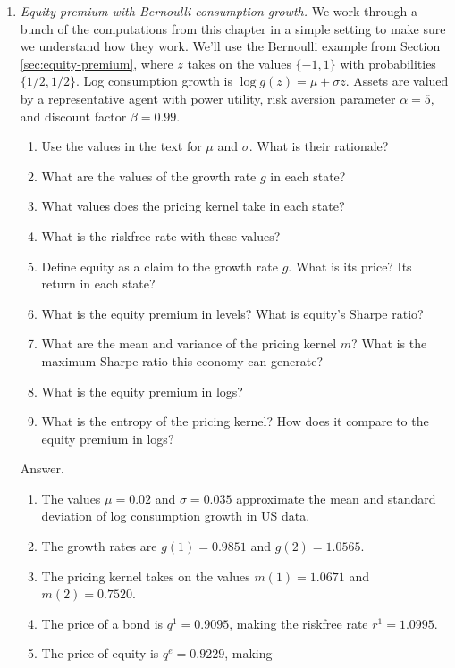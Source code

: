 \documentclass[11pt]{article}
\begin{document}
\begin{enumerate}

\item {\it Equity premium with Bernoulli consumption growth.\/}
We work through a bunch of the computations from this chapter
in a simple setting to make sure we understand how they work.
We'll use the Bernoulli example from Section \ref{sec:equity-premium},
where  $ z $  takes on the values $\{-1, 1\}$ with probabilities $\{ 1/2, 1/2 \}$.
Log consumption growth is $ \log g(z) = \mu + \sigma z$.
Assets are valued by a representative agent with power utility,
risk aversion parameter $\alpha = 5$, and discount factor $\beta = 0.99$.

\begin{enumerate}
\item Use the values in the text for $\mu$ and $\sigma$.
What is their rationale?
\item What are the values of the growth rate $g$ in each state?
\item What values does the pricing kernel take in each state?
\item What is the riskfree rate with these values?
\item Define equity as a claim to the growth rate $g$.
What is its price?
Its return in each state?
\item What is the equity premium in levels?
What is equity's Sharpe ratio?
\item What are the mean and variance of the pricing kernel $m$?
What is the maximum Sharpe ratio this economy can generate?
\item What is the equity premium in logs?
\item What is the entropy of the pricing kernel?
How does it compare to the equity premium in logs?
\end{enumerate}
%
Answer.
\begin{enumerate}
\item The values $\mu = 0.02$ and $\sigma = 0.035$ approximate
the mean and standard deviation of log consumption growth in US data.
\item The growth rates are $ g(1) =  0.9851 $ and $g(2) = 1.0565 $.
\item The pricing kernel takes on the values
$ m(1) = 1.0671$ and $m(2) = 0.7520 $.
\item The price of a bond is $q^1 = 0.9095$, making the riskfree rate
$ r^1 = 1.0995 $.
\item The price of equity is $ q^e =  0.9229$, making

\end{enumerate}
\end{enumerate}
\end{document}
